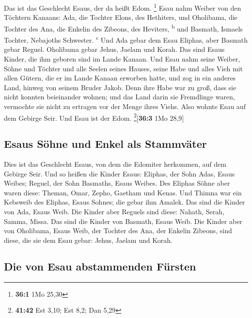  Das ist das Geschlecht Esaus, der da heißt Edom.
\footnote{\textbf{36:1} 1Mo 25,30}  Esau nahm Weiber von
den Töchtern Kanaans: Ada, die Tochter Elons, des Hethiters, und
Oholibama, die Tochter des Ana, die Enkelin des Zibeons, des Heviters,
\textsuperscript{b}  und Basmath, Ismaels Tochter,
Nebajoths Schwester. \textsuperscript{c}  Und Ada gebar
dem Esau Eliphas, aber Basmath gebar Reguel.  Oholibama
gebar Jehus, Jaelam und Korah. Das sind Esaus Kinder, die ihm geboren
sind im Lande Kanaan.  Und Esau nahm seine Weiber, Söhne
und Töchter und alle Seelen seines Hauses, seine Habe und alles Vieh mit
allen Gütern, die er im Lande Kanaan erworben hatte, und zog in ein
anderes Land, hinweg von seinem Bruder Jakob.  Denn ihre
Habe war zu groß, dass sie nicht konnten beieinander wohnen; und das
Land darin sie Fremdlinge waren, vermochte sie nicht zu ertragen vor der
Menge ihres Viehs.  Also wohnte Esau auf dem Gebirge Seir.
Und Esau ist der Edom. \footnote{\textbf{41:42} Est 3,10; Est 8,2; Dan
  5,29}{[}\textbf{36:3} 1Mo 28,9{]}

\hypertarget{esaus-suxf6hne-und-enkel-als-stammvuxe4ter}{%
\subsection{Esaus Söhne und Enkel als
Stammväter}\label{esaus-suxf6hne-und-enkel-als-stammvuxe4ter}}

 Dies ist das Geschlecht Esaus, von dem die Edomiter
herkommen, auf dem Gebirge Seir.  Und so heißen die
Kinder Esaus: Eliphas, der Sohn Adas, Esaus Weibes; Reguel, der Sohn
Basmaths, Esaus Weibes.  Des Eliphas Söhne aber waren
diese: Theman, Omar, Zepho, Gaetham und Kenas.  Und
Thimna war ein Kebsweib des Eliphas, Esaus Sohnes; die gebar ihm Amalek.
Das sind die Kinder von Ada, Esaus Weib.  Die Kinder aber
Reguels sind diese: Nahath, Serah, Samma, Missa. Das sind die Kinder von
Basmath, Esaus Weib.  Die Kinder aber von Oholibama,
Esaus Weib, der Tochter des Ana, der Enkelin Zibeons, sind diese, die
sie dem Esau gebar: Jehus, Jaelam und Korah.

\hypertarget{die-von-esau-abstammenden-fuxfcrsten}{%
\subsection{Die von Esau abstammenden
Fürsten}\label{die-von-esau-abstammenden-fuxfcrsten}}

